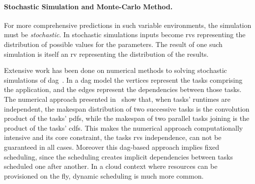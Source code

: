 \documentclass[]{llncs}
\begin{document}
\paragraph{Stochastic Simulation and Monte-Carlo Method.}
For  more   comprehensive  predictions  in  such   variable  environments,  the
simulation must  be \emph{stochastic}.  In stochastic simulations  inputs become
\acfp{rv} representing the  distribution of possible values  for the parameters.
The  result  of one  such  simulation  is  itself  an \ac{rv}  representing  the
distribution  of the  results. 

Extensive  work  has  been  done  on numerical  methods  to  solving  stochastic
simulations of  \ac{dag}~\cite{Li97,Ludwig01}. In a \ac{dag}  model the vertices
represent  the tasks  comprising the  application, and  the edges  represent the
dependencies   between   those   tasks.   The   numerical   approach   presented
in~\cite{Li97,Ludwig01}  show that,  when tasks'  runtimes are  independent, the
makespan distribution of two successive tasks  is the convolution product of the
tasks'  \aclp{pdf}, while  the makespan  of two  parallel tasks  joining is  the
product  of   the  tasks'   \aclp{cdf}.  This   makes  the   numerical  approach
computationally  intensive   and  its  core  constraint,   the  tasks  \acp{rv}
independence, can  not be guaranteed  in all cases. Moreover  this \ac{dag}-based
approach  implies  fixed  scheduling,  since  the  scheduling  creates  implicit
dependencies between tasks scheduled one after another. In a cloud context where
resources can be provisioned on the fly, dynamic scheduling is much more common.
\end{document}
